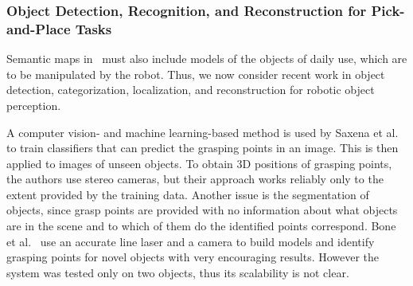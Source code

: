 \subsubsection{Object Detection, Recognition, and Reconstruction for Pick-and-Place Tasks}
\label{sec:objects}
Semantic maps in \ksem\ must also include models of the objects of daily use, which
are to be manipulated by the robot. Thus, we now consider recent
work in object detection, categorization, localization, and
reconstruction for robotic object perception.



A computer vision- and machine learning-based method is used by Saxena
et al.~\cite{Saxena08Grasping} to train classifiers that can predict
the grasping points in an image.  This is then applied to images of
unseen objects.  To obtain 3D positions of grasping points, the
authors use stereo cameras, but their approach works reliably only to
the extent provided by the training data.  Another issue is the
segmentation of objects, since grasp points are provided with no
information about what objects are in the scene and to which of them
do the identified points correspond.  Bone et
al.~\cite{Lambert08Grasping} use an accurate line laser and a camera
to build models and identify grasping points for novel objects with
very encouraging results.  However the system was tested only on two
objects, thus its scalability is not clear.


